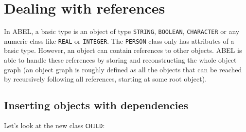 \documentclass[a4paper,12pt]{report}
\begin{document}
%

\chapter{Dealing with references}
\label {chapter:references}

In ABEL, a basic type is an object of type \lstinline!STRING!, \lstinline!BOOLEAN!, \lstinline!CHARACTER! or any numeric class like \lstinline!REAL! or \lstinline!INTEGER!.
The \lstinline!PERSON! class only has attributes of a basic type. 
However, an object can contain references to other objects. ABEL is able to handle these references by storing and reconstructing the whole object graph 
(an object graph is roughly defined as all the objects that can be reached by recursively following all references, starting at some root object).

\section{Inserting objects with dependencies}
Let's look at the new class \lstinline!CHILD!:
\end{document}
